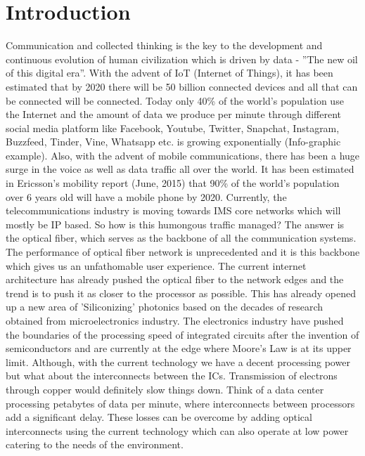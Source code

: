 \documentclass[../report.tex]{subfiles}
\begin{document}
	
	
\chapter{Introduction} 
Communication and collected thinking is the key to the development and continuous evolution of human civilization which is driven by data - ”The new oil of this digital era”. With the advent of IoT (Internet of Things), it has been estimated that by 2020 there will be 50 billion connected devices and all that can be connected will be connected. Today only 40\% of the world’s population use the Internet and the amount of data we produce per minute through different social media platform like Facebook, Youtube, Twitter, Snapchat, Instagram, Buzzfeed, Tinder, Vine, Whatsapp etc. is growing exponentially (Info-graphic example). Also, with the advent of mobile communications, there has been a huge surge in the voice as well as data traffic all over the world. It has been estimated in Ericsson’s mobility report (June, 2015) that 90\% of the world’s population over 6 years old will have a mobile phone by 2020. Currently, the telecommunications industry is moving towards IMS core networks which will mostly be IP based. So how is this humongous traffic managed? The answer is the optical fiber, which serves as the backbone of all the communication systems. The performance of optical fiber network is unprecedented and it is this backbone which gives us an unfathomable user experience. The current internet architecture has already pushed the optical fiber to the network edges and the trend is to push it as closer to the processor as possible. This has already opened up a new area of 'Siliconizing' photonics based on the decades of research obtained from microelectronics industry. The electronics industry have pushed the boundaries of the processing speed of integrated circuits after the invention of semiconductors and are currently at the edge where Moore’s Law is at its upper limit. Although, with the current technology we have a decent processing power but what about the interconnects between the ICs. Transmission of electrons through copper would definitely slow things down. Think of a data center processing petabytes of data per minute, where interconnects between processors add a significant delay. These losses can be overcome by adding optical interconnects using the current technology which can also operate at low power catering to the needs of the environment.  
	
\end{document}
